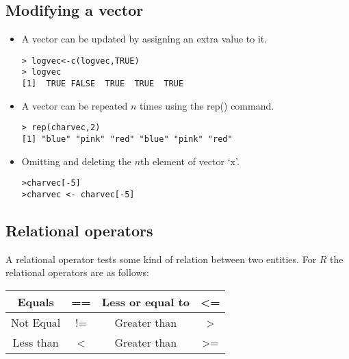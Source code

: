 
\subsection{Modifying a vector}

\begin{itemize}
\item A vector can be updated by assigning an extra value to it.
\begin{verbatim}
> logvec<-c(logvec,TRUE)
> logvec
[1]  TRUE FALSE  TRUE  TRUE  TRUE
\end{verbatim}

\item A vector can be repeated $n$ times using the rep() command.
\begin{verbatim}
> rep(charvec,2)
[1] "blue" "pink" "red" "blue" "pink" "red"
\end{verbatim}

\item Omitting and deleting the $n$th element of vector `x'.
\begin{verbatim}
>charvec[-5]
>charvec <- charvec[-5]
\end{verbatim}

\end{itemize}

\subsection{Relational operators}
A relational operator tests some kind of relation between two
entities. For $R$ the relational operators are as follows:
\begin{center}
\begin{tabular}{|c|c|c|c|}
  \hline

  Equals & == & Less or equal to  & <= \\
  \hline
  Not Equal & != & Greater than & > \\
  \hline
  Less than & < & Greater than & >= \\
  \hline
\end{tabular}
\end{center}

